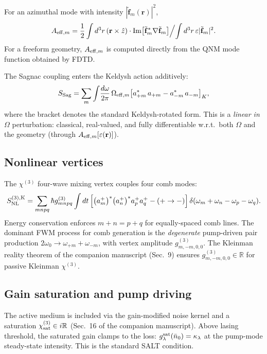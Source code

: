\documentclass[11pt]{article}
\newcommand{\NL}{{\rm NL}}
\newcommand{\eff}{{\rm eff}}
\newcommand{\K}{{\rm K}}
\newcommand{\Sag}{{\rm Sag}}
\newcommand{\tf}{\tilde{\mathbf{f}}}
\begin{document}
For an azimuthal mode with intensity $|\tf_m(\mathbf{r})|^2$,
\begin{equation}
  A_{\eff,m} = \frac{1}{2}\int d^3r\,(\mathbf{r}\times\hat z)\cdot
  \mathrm{Im}\bigl[\tf_m^*\nabla\tf_m\bigr]\Big/\!\int d^3r\,\varepsilon |\tf_m|^2.
\end{equation}
For a freeform geometry, $A_{\eff,m}$ is computed directly from the
QNM mode function obtained by FDTD.

The Sagnac coupling enters the Keldysh action additively:
\begin{equation}
  S_\Sag = \sum_m \int\!\frac{d\omega}{2\pi}\,
  \Omega_{\eff,m}\bigl[a^*_{+m}\,a_{+m} - a^*_{-m}\,a_{-m}\bigr]_K,
\end{equation}
where the bracket denotes the standard Keldysh-rotated form.  This is
a \emph{linear in $\Omega$} perturbation: classical, real-valued, and
fully differentiable w.r.t.\ both $\Omega$ and the geometry (through
$A_{\eff,m}[\varepsilon(\mathbf{r})]$).

\subsection{Nonlinear vertices}

The $\chi^{(3)}$ four-wave mixing vertex couples four comb modes:
\begin{equation}
  S_\NL^{(3),\K} = \sum_{mnpq} \hbar g^{(3)}_{mnpq}
  \int dt\,\Bigl[\bigl(a^+_m\bigr)^*\bigl(a^+_n\bigr)^* a^+_p a^+_q
                 - (+\to-)\Bigr]\,
  \delta(\omega_m+\omega_n-\omega_p-\omega_q).
\end{equation}
Energy conservation enforces $m+n=p+q$ for equally-spaced comb lines.
The dominant FWM process for comb generation is the
\emph{degenerate} pump-driven pair production $2\omega_0
\to \omega_{+m} + \omega_{-m}$, with vertex amplitude
$g^{(3)}_{m,-m,0,0}$.  The Kleinman reality theorem of the companion
manuscript (Sec.~9) ensures $g^{(3)}_{m,-m,0,0}\in\mathbb{R}$ for
passive Kleinman $\chi^{(3)}$.

\subsection{Gain saturation and pump driving}

The active medium is included via the gain-modified noise kernel and
a saturation $\chi^{(3)}_{\rm sat}\in i\mathbb{R}$ (Sec.~16 of the
companion manuscript).  Above lasing threshold, the saturated gain
clamps to the loss: $g_\lambda^{\rm sat}(\bar n_0) = \kappa_\lambda$
at the pump-mode steady-state intensity.  This is the standard SALT
condition.
\end{document}
